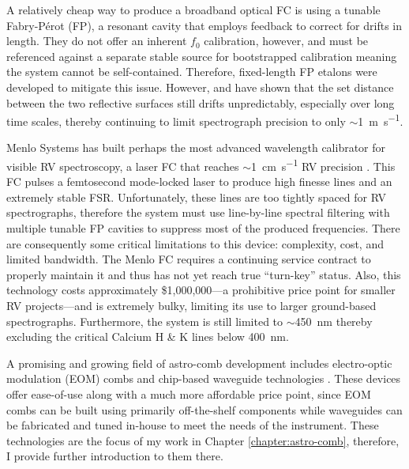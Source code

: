 A relatively cheap way to produce a broadband optical FC is using a tunable Fabry-P\'erot (FP), a resonant cavity that employs feedback to correct for drifts in length. They do not offer an inherent $f_0$ calibration, however, and must be referenced against a separate stable source for bootstrapped calibration \citep{mccracken_single-lock_2014, sturmer_rubidium-traced_2017} meaning the system cannot be self-contained. Therefore, fixed-length FP etalons were developed to mitigate this issue. However, \citet{reiners_laser-lock_2014} and \citet{wildi_passive_2012} have shown that the set distance between the two reflective surfaces still drifts unpredictably, especially over long time scales, thereby continuing to limit spectrograph precision to only $\sim$\SI{1}{\meter\per\second}.

Menlo Systems has built perhaps the most advanced wavelength calibrator for visible RV spectroscopy, a laser FC that reaches $\sim$\SI{1}{\centi\meter\per\second} RV precision \citep{probst_laser_2014}. This FC pulses a femtosecond mode-locked laser to produce high finesse lines and an extremely stable FSR. Unfortunately, these lines are too tightly spaced for RV spectrographs, therefore the system must use line-by-line spectral filtering with multiple tunable FP cavities to suppress most of the produced frequencies. There are consequently some critical limitations to this device: complexity, cost, and limited bandwidth. The Menlo FC requires a continuing service contract to properly maintain it and thus has not yet reach true ``turn-key'' status. Also, this technology costs approximately \$1,000,000---a prohibitive price point for smaller RV projects---and is extremely bulky, limiting its use to larger ground-based spectrographs. Furthermore, the system is still limited to $\sim$\SI{450}{\nano\meter} thereby excluding the critical Calcium H \& K lines below \SI{400}{\nano\meter}.

A promising and growing field of astro-comb development includes electro-optic modulation (EOM) combs and chip-based waveguide technologies \citep[e.g.][]{carlson_ultrafast_2017}. These devices offer ease-of-use along with a much more affordable price point, since EOM combs can be built using primarily off-the-shelf components while waveguides can be fabricated and tuned in-house to meet the needs of the instrument. These technologies are the focus of my work in Chapter \ref{chapter:astro-comb}, therefore, I provide further introduction to them there.


